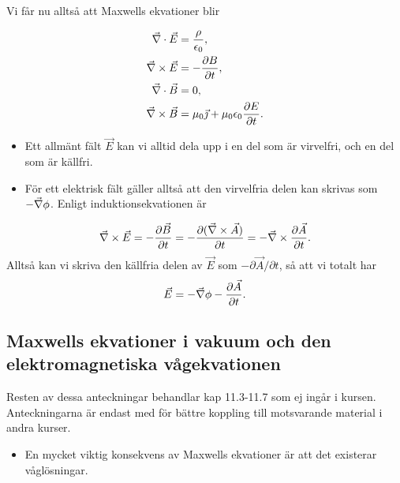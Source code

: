 \documentclass[%
oneside,                 %
final,                   %
10pt]{article}
\newenvironment{summary_mdfboxadmon}[1][]{
\begin{summary_mdfboxmdframed}[frametitle=#1]
}
{
\end{summary_mdfboxmdframed}
}
\newenvironment{warning_mdfboxadmon}[1][]{
\begin{warning_mdfboxmdframed}[frametitle=#1]
}
{
\end{warning_mdfboxmdframed}
}
\begin{document}
Vi får nu alltså att Maxwells ekvationer blir


\begin{summary_mdfboxadmon}
\begin{align}
  \vec{\nabla} \cdot \vec{E} &= \frac{\rho}{\epsilon_0}, \\
  \vec{\nabla} \times \vec{E} &= - \frac{\partial B}{\partial t}, \\
  \vec{\nabla} \cdot \vec{B} &= 0, \\
  \vec{\nabla} \times \vec{B} &= \mu_0 \vec{\jmath} + \mu_0 \epsilon_0 
\frac{\partial E}{\partial t}.
\end{align}
\end{summary_mdfboxadmon} %



\begin{itemize}
\item Ett allmänt fält $\vec{E}$ kan vi alltid dela upp i en del som är virvelfri, och en del som är källfri. 

\item För ett elektrisk fält gäller alltså att den virvelfria delen kan skrivas som $-\vec{\nabla} \phi$.  Enligt induktionsekvationen är
\end{itemize}

\noindent
$$
\vec{\nabla} \times \vec{E} = - \frac{\partial \vec{B}}{\partial t} = -
\frac{\partial (\vec{\nabla} \times \vec{A})}{\partial t} = - \vec{\nabla} \times 
\frac{\partial \vec{A}}{\partial t}.
$$
Alltså kan vi skriva den källfria delen av $\vec{E}$ som
$-\partial \vec{A} / \partial t$, så att vi totalt har
\begin{equation}
  \vec{E} = - \vec{\nabla} \phi - \frac{\partial \vec{A}}{\partial t}.
\end{equation}


\subsection*{Maxwells ekvationer i vakuum och den elektromagnetiska vågekvationen}


\begin{warning_mdfboxadmon}[OBS!]
Resten av dessa anteckningar behandlar kap 11.3-11.7 som ej ingår i kursen. Anteckningarna är endast med för bättre koppling till motsvarande material i andra kurser.
\end{warning_mdfboxadmon} %



\begin{itemize}
\item En mycket viktig konsekvens av Maxwells ekvationer är att det existerar våglösningar.
\end{itemize}
\end{document}
